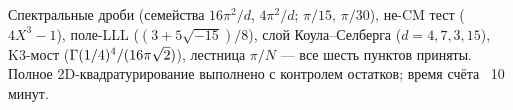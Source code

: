 \begin{statusbox}[сертификат G]
Спектральные дроби (семейства $16\pi^2/d$, $4\pi^2/d$; $\pi/15$,
$\pi/30$), не-CM тест ($4X^3-1$), поле-LLL ($(3+5\sqrt{-15})/8$),
слой Коула--Селберга ($d=4,7,3,15$), K3-мост
($\Gamma(1/4)^4/(16\pi\sqrt2)$), лестница $\pi/N$ — все шесть пунктов
приняты. Полное 2D-квадратурирование выполнено с контролем
остатков; время счёта ~10 минут.
\end{statusbox}
